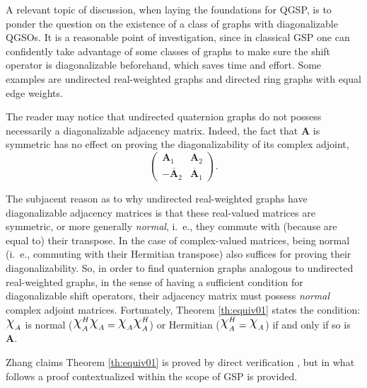 A relevant topic of discussion, when laying the foundations for QGSP, is to ponder the question on the existence of a class of graphs with diagonalizable QGSOs. It is a reasonable point of investigation, since in classical GSP one can confidently take advantage of some classes of graphs to make sure the shift operator is diagonalizable beforehand, which saves time and effort. Some examples are undirected real-weighted graphs and directed ring graphs with equal edge weights.

The reader may notice that undirected quaternion graphs do not possess necessarily a diagonalizable adjacency matrix. Indeed, the fact that $\mathbf{A}$ is symmetric has no effect on proving the diagonalizability of its complex adjoint,
\begin{equation}
    \begin{pmatrix}
        \mathbf{A}_1              & \mathbf{A}_2            \\
        - \overline{\mathbf{A}}_2 & \overline{\mathbf{A}}_1
    \end{pmatrix}.
\end{equation}

The subjacent reason as to why undirected real-weighted graphs have diagonalizable adjacency matrices is that these real-valued matrices are symmetric, or more generally \textit{normal}, i.~e., they commute with (because are equal to) their transpose. In the case of complex-valued matrices, being normal (i.~e., commuting with their Hermitian transpose) also suffices for proving their diagonalizability. So, in order to find quaternion graphs analogous to undirected real-weighted graphs, in the sense of having a sufficient condition for diagonalizable shift operators, their adjacency matrix must possess \textit{normal} complex adjoint matrices. Fortunately, Theorem \ref{th:equiv01} states the condition:
$ \rchi_{A}$ is normal ($ \rchi_{A}^H \rchi_{A} = \rchi_{A} \rchi_{A}^H $) or Hermitian ($\rchi_{A}^H = \rchi_{A}$) if and only if so is $ \mathbf{A}$.

Zhang claims Theorem \ref{th:equiv01} is proved by direct verification \cite{zhang1997quaternions}, but in what follows a proof contextualized within the scope of GSP is provided.

